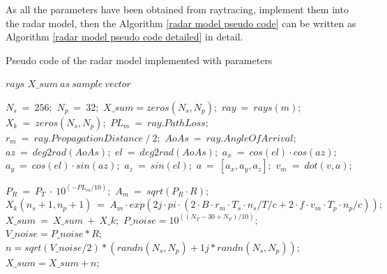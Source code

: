 \documentclass[12pt,DIV14,BCOR12mm,a4paper,footinclude=false,headinclude,parskip=half-,twoside,openright,cleardoublepage=empty,toc=index,bibliography=totoc,listof=totoc]{scrreprt}
\numberwithin{equation}{chapter}
\begin{document}
As all the parameters have been obtained from raytracing, implement them into the radar model, then the Algorithm \ref{radar model pseudo code} can be written as Algorithm \ref{radar model pseudo code detailed} in detail.

\begin{algorithm}[t]
    \caption{Pseudo code of the radar model implemented with parameters}
    \label{radar model pseudo code detailed}
    \renewcommand{\algorithmicrequire}{\textbf{Input:}}
    \renewcommand{\algorithmicensure}{\textbf{Output:}}
    
    \begin{algorithmic}[1]
        \REQUIRE $rays$
        \ENSURE $X\_sum\ as\ sample\ vector$
        
        \STATE $N_s\ =\ 256;$
        \STATE $N_p\ =\ 32;$
        \STATE $X\_sum = zeros(N_s,N_p);$
            \STATE $ray\ =\ rays(m);$
            \STATE $X_k\ =\ zeros(N_s,N_p);$
            \STATE $PL_m\ =\ ray.PathLoss;$
            \STATE $r_m\ =\ ray.PropagationDistance\ /\ 2;$
            \STATE $AoAs\ =\ ray.AngleOfArrival;$
            \STATE $az\ =\ deg2rad(AoAs);$
            \STATE $el\ =\ deg2rad(AoAs);$
            \STATE $a_x\ =\ cos(el) \cdot cos(az);$
            \STATE $a_y\ =\ cos(el) \cdot sin(az);$
            \STATE $a_z\ =\ sin(el);$
            \STATE $a\ =\ [a_x, a_y, a_z];$
            \STATE $v_m\ =\ dot(v, a);$
        
                    \STATE $P_R\ =\ P_T\ \cdot \ 10^{(-PL_m/10)};$
                    \STATE $A_m\ =\ sqrt(P_R \cdot R);$
                    \STATE $X_k(n_s+1,n_p+1)\ =\ A_m \cdot exp(2j\cdot pi \cdot (2\cdot B \cdot r_m\cdot T_s\cdot n_s/T/c + 2\cdot f\cdot v_m\cdot T_p\cdot n_p/c));$
                \ENDFOR
            \ENDFOR
            \STATE $X\_sum\ =\ X\_sum\ +\ X\_k;$
        \ENDFOR 
        \STATE $P\_noise = 10^{((N_T - 30 + N_F)/10)};$
        \STATE $V\_noise = P\_noise * R;$
        \STATE $n = sqrt(V\_noise/2) * (randn(N_s, N_p) + 1j* randn(N_s, N_p));$
        \STATE $X\_sum = X\_sum + n;$
    \end{algorithmic}   
\end{algorithm}
\end{document}
